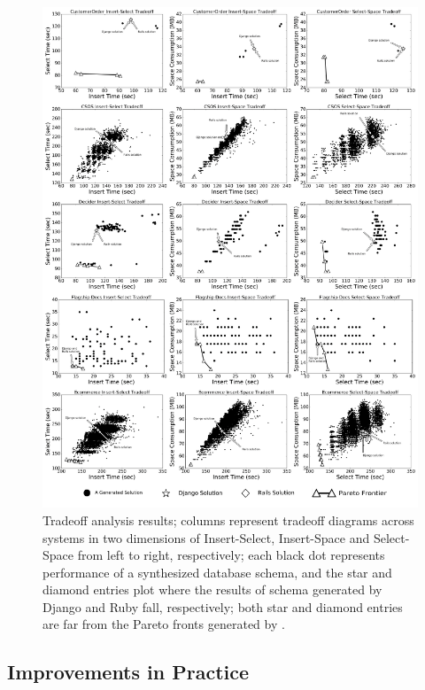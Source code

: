 \documentclass{sig-alternate}
\begin{document}
\begin{figure}[hbtp]
\centering
\includegraphics[width=\textwidth]{img/result_figure.pdf}
\vspace{-1cm}
\caption{Tradeoff analysis results; columns represent tradeoff diagrams across systems in two dimensions of Insert-Select, Insert-Space and Select-Space from left to right, respectively; each black dot represents performance of a synthesized database schema, and the star and diamond entries plot where the results of schema generated by Django and Ruby fall, respectively; both star and diamond entries are far from the Pareto fronts generated by \@approach.
}
\label{fig:analysis_result}
\end{figure}


\subsection{Improvements in Practice} %
\end{document}
